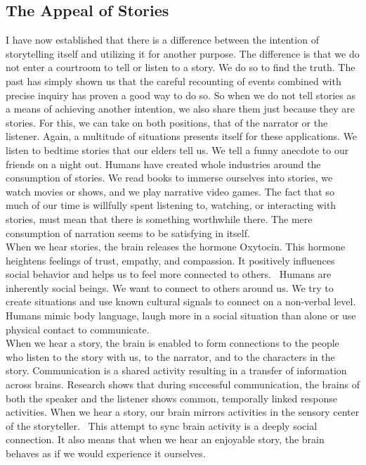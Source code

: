 \subsection{The Appeal of Stories}
I have now established that there is a difference between the intention of storytelling itself and utilizing it for another purpose. The difference is that we do not enter a courtroom to tell or listen to a story. We do so to find the truth. The past has simply shown us that the careful recounting of events combined with precise inquiry has proven a good way to do so. So when we do not tell stories as a means of achieving another intention, we also share them just because they are stories. For this, we can take on both positions, that of the narrator or the listener. Again, a multitude of situations presents itself for these applications. We listen to bedtime stories that our elders tell us. We tell a funny anecdote to our friends on a night out. Humans have created whole industries around the consumption of stories. We read books to immerse ourselves into stories, we watch movies or shows, and we play narrative video games. The fact that so much of our time is willfully spent listening to, watching, or interacting with stories, must mean that there is something worthwhile there. The mere consumption of narration seems to be satisfying in itself.\\
When we hear stories, the brain releases the hormone Oxytocin. This hormone heightens feelings of trust, empathy, and compassion. It positively influences social behavior and helps us to feel more connected to others.~\cite{Gottschall2012} Humans are inherently social beings. We want to connect to others around us. We try to create situations and use known cultural signals to connect on a non-verbal level. Humans mimic body language, laugh more in a social situation than alone or use physical contact to communicate.~\cite{Frith2007}\\
When we hear a story, the brain is enabled to form connections to the people who listen to the story with us, to the narrator, and to the characters in the story. Communication is a shared activity resulting in a transfer of information across brains. Research shows that during successful communication, the brains of both the speaker and the listener shows common, temporally linked response activities. When we hear a story, our brain mirrors activities in the sensory center of the storyteller.~\cite{Stephens2010} This attempt to sync brain activity is a deeply social connection. It also means that when we hear an enjoyable story, the brain behaves as if we would experience it ourselves.
